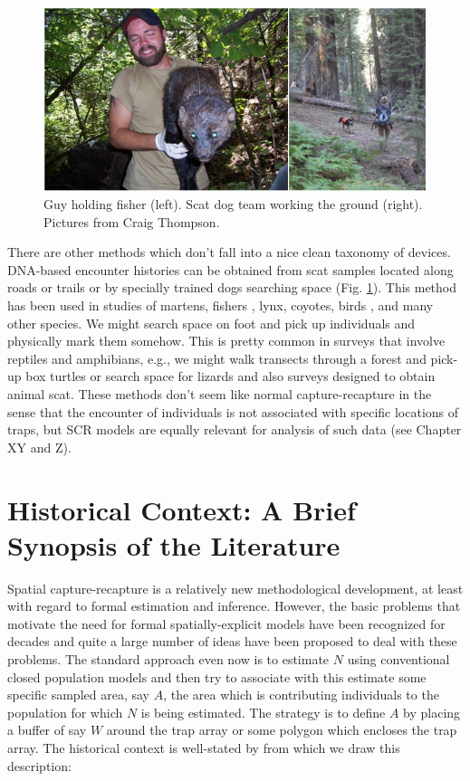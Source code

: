 \begin{figure}
\begin{center}
\includegraphics[width=5in]{Ch1/figs/beardog}
\end{center}
\caption{Guy holding fisher (left). Scat dog team working the ground
  (right). Pictures from Craig Thompson.}
\label{fig.fisherscatdog}
\end{figure}


There are other methods which don't fall into a nice clean taxonomy of
devices. DNA-based encounter histories can be obtained from scat
samples located along roads or trails or by specially trained dogs
\citep{mackay_etal:2008} searching space
(Fig. \ref{fig.fisherscatdog}). This method has been used in studies
of martens, fishers \citep{thompson_etal:inpress}, lynx, coyotes,
birds \citet{kery_etal:2010}, and many other species. We might search
space on foot and pick up individuals and physically mark them
somehow. This is pretty common in surveys that involve reptiles and
amphibians, e.g., we might walk transects through a forest and pick-up
box turtles \citep{hall_etal:1999} or search space for lizards
\citep{royle_young:2008} and also surveys designed to obtain animal
scat. These methods don't seem like normal capture-recapture in the
sense that the encounter of individuals is not associated with
specific locations of traps, but SCR models are equally relevant for
analysis of such data (see Chapter XY and Z).


\section{ Historical Context: A Brief Synopsis of the Literature}

Spatial capture-recapture is a relatively new methodological
development, at least with regard to formal estimation and
inference. However, the basic problems that motivate the need for
formal spatially-explicit models have been recognized for decades and
quite a large number of ideas have been proposed to deal with these
problems. The standard approach even now is to estimate $N$ using
conventional closed population models \citep{otis_etal:1978} and then
try to associate with this estimate some specific sampled area, say $A$,
the area which is contributing individuals to the population for which
$N$ is being estimated. The strategy is to define $A$ by placing a buffer
of say $W$ around the trap array or some polygon which encloses the trap
array. The historical context is well-stated by \citep{obrien:2011}
from which we draw this description:

